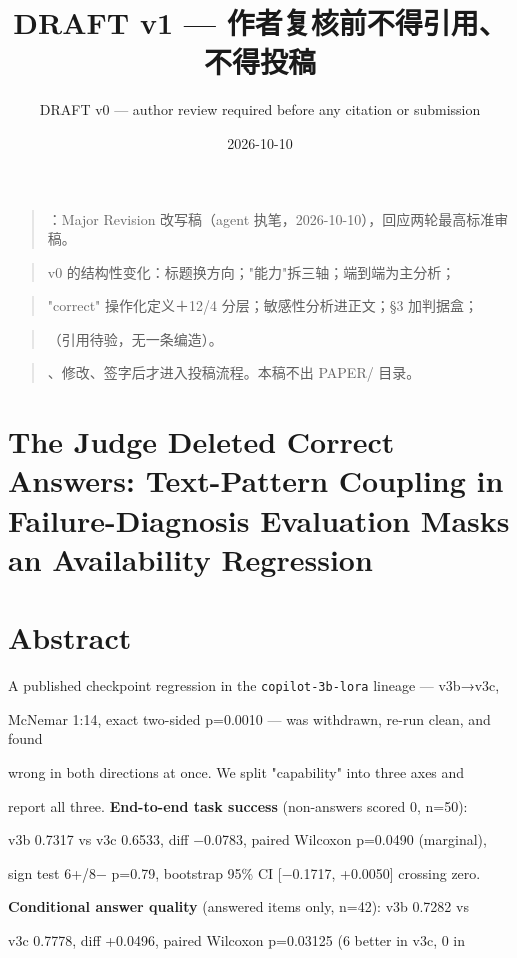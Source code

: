 \documentclass[11pt,a4paper]{article}
\begin{document}
\title{DRAFT v1 — 作者复核前不得引用、不得投稿}
\author{DRAFT v0 --- author review required before any citation or submission}
\date{2026-10-10}
\maketitle
\begin{quote}：Major Revision 改写稿（agent 执笔，2026-10-10），回应两轮最高标准审稿。\end{quote}
\begin{quote} v0 的结构性变化：标题换方向；"能力"拆三轴；端到端为主分析；\end{quote}
\begin{quote}\small"correct" 操作化定义＋12/4 分层；敏感性分析进正文；§3 加判据盒；\end{quote}
\begin{quote}（引用待验，无一条编造）。\end{quote}
\begin{quote}、修改、签字后才进入投稿流程。本稿不出 PAPER/ 目录。\end{quote}
\section*{The Judge Deleted Correct Answers: Text-Pattern Coupling in Failure-Diagnosis Evaluation Masks an Availability Regression}
\section*{Abstract}
A published checkpoint regression in the \texttt{copilot-3b-lora} lineage — v3b→v3c,

McNemar 1:14, exact two-sided p=0.0010 — was withdrawn, re-run clean, and found

wrong in both directions at once. We split "capability" into three axes and

report all three. \textbf{End-to-end task success} (non-answers scored 0, n=50):

v3b 0.7317 vs v3c 0.6533, diff −0.0783, paired Wilcoxon p=0.0490 (marginal),

sign test 6+/8− p=0.79, bootstrap 95\% CI [−0.1717, +0.0050] crossing zero.

\textbf{Conditional answer quality} (answered items only, n=42): v3b 0.7282 vs

v3c 0.7778, diff +0.0496, paired Wilcoxon p=0.03125 (6 better in v3c, 0 in
\end{document}
